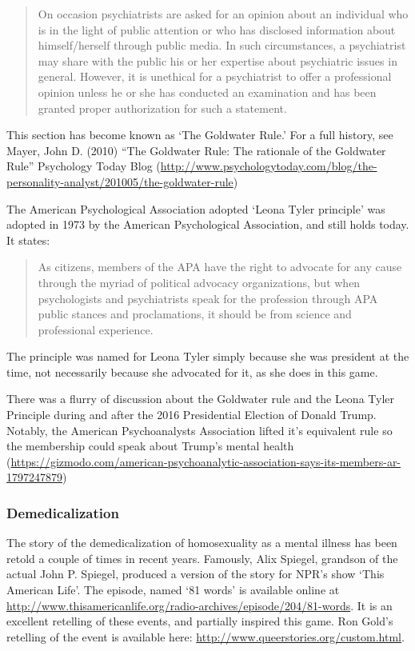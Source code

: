 \begin{refsection}
\begin{quote}
On occasion psychiatrists are asked for an opinion about an individual who is in the light of public attention or who has disclosed information about himself\slash herself through public media. In such circumstances, a psychiatrist may share with the public his or her expertise about psychiatric issues in general. However, it is unethical for a psychiatrist to offer a professional opinion unless he or she has conducted an examination and has been granted proper authorization for such a statement.
\end{quote}

This section has become known as `The Goldwater Rule.' For a full history, see Mayer, John D. (2010) “The Goldwater Rule: The rationale of the Goldwater Rule” Psychology Today Blog (\url{http://www.psychologytoday.com/blog/the-personality-analyst/201005/the-goldwater-rule})

The American Psychological Association adopted `Leona Tyler principle' was adopted in 1973 by the American Psychological Association, and still holds today. It states:

\begin{quote}

As citizens, members of the APA have the right to advocate for any cause through the myriad of political advocacy organizations, but when psychologists and psychiatrists speak for the profession through APA public stances and proclamations, it should be from science and professional experience. 
\end{quote}

The principle was named for Leona Tyler simply because she was president at the time, not necessarily because she advocated for it, as she does in this game. 

There was a flurry of discussion about the Goldwater rule and the Leona Tyler Principle during and after the 2016 Presidential Election of Donald Trump. Notably, the American Psychoanalysts Association lifted it's equivalent rule so the membership could speak about Trump's mental health (\url{https://gizmodo.com/american-psychoanalytic-association-says-its-members-ar-1797247879})

\subsubsection{Demedicalization}
\label{demedicalization}

The story of the demedicalization of homosexuality as a mental illness has been retold a couple of times in recent years. Famously, Alix Spiegel, grandson of the actual John P. Spiegel, produced a version of the story for NPR's show `This American Life'. The episode, named `81 words' is available online at \url{http://www.thisamericanlife.org/radio-archives/episode/204/81-words}. It is an excellent retelling of these events, and partially inspired this game. Ron Gold's retelling of the event is available here: \url{http://www.queerstories.org/custom.html}.


\end{refsection}
